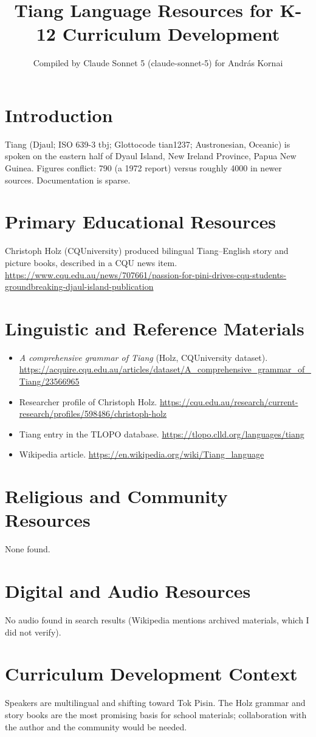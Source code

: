 \documentclass[12pt]{article}
\title{Tiang Language Resources for K-12 Curriculum Development}
\author{Compiled by Claude Sonnet 5 (claude-sonnet-5) for Andr\'as Kornai}
\date{}
\begin{document}
\maketitle
\section{Introduction}
Tiang (Djaul; ISO 639-3 tbj; Glottocode tian1237; Austronesian, Oceanic) is spoken on the eastern half of Dyaul Island, New Ireland Province, Papua New Guinea. Figures conflict: 790 (a 1972 report) versus roughly 4000 in newer sources. Documentation is sparse.
\section{Primary Educational Resources}
Christoph Holz (CQUniversity) produced bilingual Tiang--English story and picture books, described in a CQU news item. \url{https://www.cqu.edu.au/news/707661/passion-for-pini-drives-cqu-students-groundbreaking-djaul-island-publication}
\section{Linguistic and Reference Materials}
\begin{itemize}
\item \emph{A comprehensive grammar of Tiang} (Holz, CQUniversity dataset). \url{https://acquire.cqu.edu.au/articles/dataset/A_comprehensive_grammar_of_Tiang/23566965}
\item Researcher profile of Christoph Holz. \url{https://cqu.edu.au/research/current-research/profiles/598486/christoph-holz}
\item Tiang entry in the TLOPO database. \url{https://tlopo.clld.org/languages/tiang}
\item Wikipedia article. \url{https://en.wikipedia.org/wiki/Tiang_language}
\end{itemize}
\section{Religious and Community Resources}
None found.
\section{Digital and Audio Resources}
No audio found in search results (Wikipedia mentions archived materials, which I did not verify).
\section{Curriculum Development Context}
Speakers are multilingual and shifting toward Tok Pisin. The Holz grammar and story books are the most promising basis for school materials; collaboration with the author and the community would be needed.
\end{document}
